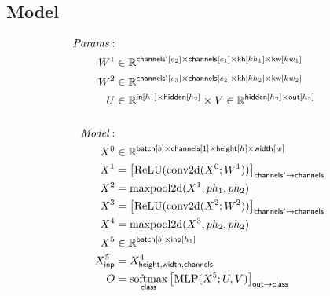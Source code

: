 \documentclass{article}
\newcommand{\reals}[0]{\mathbb{R}}
\begin{document}
\subsection*{Model}

\begin{align*} 
\textit{Params}: \\
W^1 & \in \reals^{\nset{channels'}{c_2} \times \nset{channels}{c_1} \times \nset{kh}{kh_1} \times \nset{kw}{kw_1}} \\ 
W^2 & \in \reals^{\nset{channels'}{c_3} \times \nset{channels}{c_2} \times \nset{kh}{kh_2} \times \nset{kw}{kw_2}} \\ 
U & \in \reals^{\nset{in}{h_1} \times \nset{hidden}{h_2}} \times  V \in \reals^{\nset{hidden}{h_2} \times \nset{out}{h_3}} \\ \\
\textit{Model}: \\
X^0 &\in \reals^{\nset{batch}{b} \times \nset{channels}{1} \times \nset{height}{h} \times \nset{width}{w}}\\
X^1 &= \nmov{channels'}{channels}{\text{ReLU}(\text{conv2d}(X^0; W^1))} \\
X^2 &= \text{maxpool2d}(X^1, ph_1, ph_2) \\
X^3 &= \nmov{channels'}{channels}{\text{ReLU}(\text{conv2d}(X^2; W^2))} \\
X^4 &= \text{maxpool2d}(X^3, ph_2, ph_2) \\
X^5 &\in \reals^{\nset{batch}{b} \times \nset{inp}{h_1}}\\ 
X^5_{\name{inp}} &= X^4_{\name{height}, \name{width}, \name{channels}}\\ 
O &= \nfun{class}{softmax} \nmov{out}{class}{\text{MLP}(X^5; U, V)}
\end{align*} 


\end{document}
